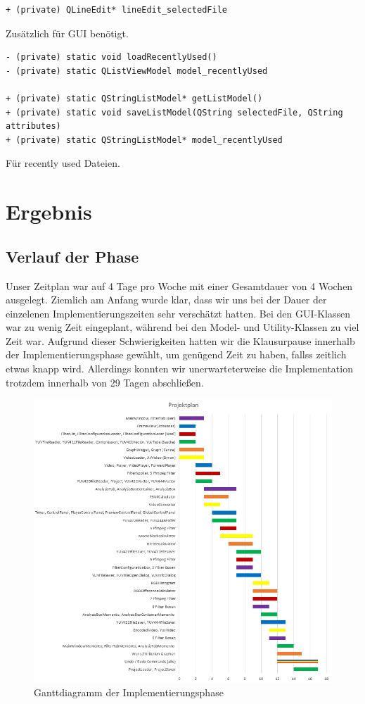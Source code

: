 \documentclass{scrartcl}
\begin{document}
{\begin{verbatim}
+ (private) QLineEdit* lineEdit_selectedFile
\end{verbatim}
Zusätzlich für GUI benötigt.
\bigskip
\begin{verbatim}
- (private) static void loadRecentlyUsed()
- (private) static QListViewModel model_recentlyUsed

+ (private) static QStringListModel* getListModel()
+ (private) static void saveListModel(QString selectedFile, QString attributes)
+ (private) static QStringListModel* model_recentlyUsed
\end{verbatim}
Für recently used Dateien.
\newpage
\section{Ergebnis}
\subsection{Verlauf der Phase} 
\bigskip
Unser Zeitplan war auf 4 Tage pro Woche mit einer Gesamtdauer von 4 Wochen ausgelegt. Ziemlich am Anfang wurde klar, dass wir uns bei der Dauer der einzelenen Implementierungszeiten sehr verschätzt hatten. Bei den GUI-Klassen war zu wenig Zeit eingeplant, während bei den Model- und Utility-Klassen zu viel Zeit war. Aufgrund dieser Schwierigkeiten hatten wir die Klausurpause innerhalb der Implementierungsphase gewählt, um genügend Zeit zu haben, fallss zeitlich etwas knapp wird. Allerdings konnten wir unerwarteterweise die Implementation trotzdem innerhalb von 29 Tagen abschließen.
\begin{figure}[ht]
\centering
\includegraphics[width=1.0\textwidth]{Pictures/gantt.png}
\caption{Ganttdiagramm der Implementierungsphase}
\end{figure}
\newpage
}
\end{document}
